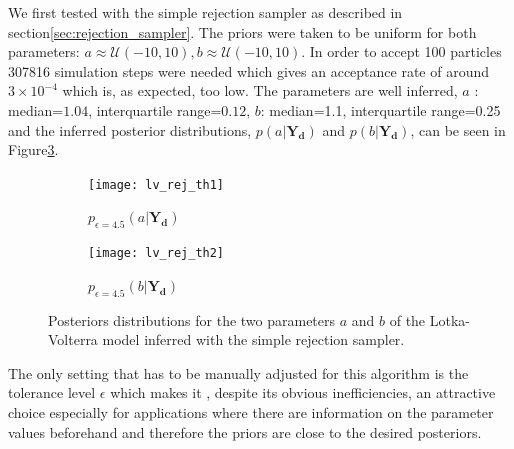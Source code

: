 We first tested with the simple rejection sampler as described in section\ref{sec:rejection_sampler}. The priors were taken to be uniform for both parameters: $a \approx \mathcal{U}(-10, 10), b \approx \mathcal{U}(-10, 10)$. In order to accept 100 particles 307816 simulation steps were needed which gives an acceptance rate of around $3 \times 10^{-4}$ which is, as expected, too low. The parameters are well inferred, $a$ : median=$1.04$, interquartile range=$0.12$, $b$: median=1.1, interquartile range=0.25 and the inferred posterior distributions, $p(a|\mathbf{Y_d})$ and $p(b|\mathbf{Y_d})$, can be seen in Figure\ref{fig:rej_posteriors_lv}.
\begin{figure}
\centering
\begin{subfigure}{.5\textwidth}
  \centering
  \texttt{[image: lv\_rej\_th1]}
  \caption{$p_{\epsilon=4.5}(a|\mathbf{Y_d})$}
  \label{fig:sub1}
\end{subfigure}%
\begin{subfigure}{.5\textwidth}
  \centering
  \texttt{[image: lv\_rej\_th2]}
  \caption{$p_{\epsilon=4.5}(b|\mathbf{Y_d})$}
  \label{fig:sub2}
\end{subfigure}
\caption{Posteriors distributions for the two parameters $a$ and $b$ of the Lotka-Volterra model inferred with the simple rejection sampler.}
\label{fig:rej_posteriors_lv}
\end{figure}
The only setting that has to be manually adjusted for this algorithm is the tolerance level $\epsilon$ which makes it , despite its obvious inefficiencies, an attractive choice especially for applications where there are information on the parameter values beforehand and therefore the priors are close to the desired posteriors. 


